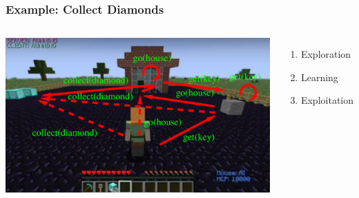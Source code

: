 \documentclass[aspectratio=169]{beamer}
\begin{document}
\begin{frame}
  \frametitle{Example: Collect Diamonds}


  \begin{columns}
    \column{4.4in}
    \includegraphics[scale=0.33]{pictures/minecraft-all-arrows.png}
    \column{1.7in}
    \begin{enumerate}
    \item Exploration
    \item Learning
    \item Exploitation
    \end{enumerate}
  \end{columns}
\end{frame}
\end{document}
